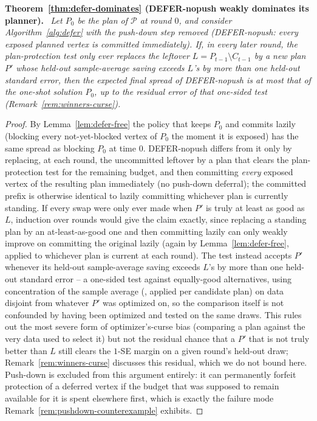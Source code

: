 \documentclass[preprint,11pt]{elsarticle}
\theoremstyle{definition}
\theoremstyle{remark}
\newenvironment{repeattheorem}[1][]{\par\medskip\noindent\textbf{#1.}\ \itshape}{\par\medskip}
\begin{document}
\begin{repeattheorem}[Theorem~\ref{thm:defer-dominates} (DEFER-nopush weakly dominates its planner)]
Let $P_0$ be the plan of $\mathcal P$ at round $0$, and consider
Algorithm~\ref{alg:defer} with the push-down step removed
(DEFER-nopush: every exposed planned vertex is committed
immediately). If, in every later round, the plan-protection test only ever
replaces the leftover $L=P_{t-1}\setminus C_{t-1}$ by a new plan $P'$
whose held-out sample-average saving exceeds $L$'s by more than one
held-out standard error, then the expected final spread of
DEFER-nopush is at most that of the one-shot solution $P_0$, up to
the residual error of that one-sided test (Remark~\ref{rem:winners-curse}).
\end{repeattheorem}
\begin{proof}
By Lemma~\ref{lem:defer-free} the policy that keeps $P_0$ and commits
lazily (blocking every not-yet-blocked vertex of $P_0$ the moment it is
exposed) has the same spread as blocking $P_0$ at time $0$.
DEFER-nopush differs from it only by replacing, at each round,
the uncommitted leftover by a plan that clears the plan-protection test
for the remaining budget, and then committing \emph{every} exposed vertex
of the resulting plan immediately (no push-down deferral); the committed
prefix is otherwise identical to lazily committing whichever plan is
currently standing. If every swap were only ever made when $P'$ is truly
at least as good as $L$, induction over rounds would give the claim
exactly, since replacing a standing plan by an at-least-as-good one and
then committing lazily can only weakly improve on committing the original
lazily (again by Lemma~\ref{lem:defer-free}, applied to whichever plan is
current at each round). The test instead accepts $P'$ whenever its
held-out sample-average saving exceeds $L$'s by more than one held-out
standard error -- a one-sided test against equally-good alternatives,
using concentration of the sample average (\citealp{xie2024}, applied per
candidate plan) on data disjoint from whatever $P'$ was optimized on, so
the comparison itself is not confounded by having been optimized and
tested on the same draws. This rules out the most severe form of
optimizer's-curse bias (comparing a plan against the very data used to
select it) but not the residual chance that a $P'$ that is not truly
better than $L$ still clears the $1$-SE margin on a given round's held-out
draw; Remark~\ref{rem:winners-curse} discusses this residual, which we do
not bound here. Push-down is excluded from this argument entirely: it can
permanently forfeit protection of a deferred vertex if the budget that was
supposed to remain available for it is spent elsewhere first, which is
exactly the failure mode Remark~\ref{rem:pushdown-counterexample}
exhibits.
\end{proof}
\end{document}
